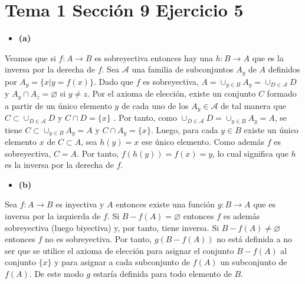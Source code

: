 \documentclass{article}
\begin{document}
\section{Tema 1 Sección 9 Ejercicio 5}
\begin{itemize}
\item \bf (a) \rm
\end{itemize}
Veamos que si $f:A\rightarrow B$ es sobreyectiva entonces hay una  $h:B\rightarrow A$ que es la inversa por la derecha de $f$. Sea $\mathcal{A}$ una familia de subconjuntos $A_y$ de $A$ definidos por $A_y=\{x|y=f(x)\}$. Dado que $f$ es sobreyectiva, $A= \cup_{y \in B}A_y=\cup_{D\in \mathcal{A}}D$ y $A_y\cap A_z=\varnothing$ si $y\neq z$. Por el axioma de elección, existe un conjunto $C$ formado a partir de un único elemento $y$ de cada uno de los $A_y\in \mathcal{A}$ de tal manera que $C\subset \cup_{D\in \mathcal{A}}D$ y $C\cap D=\{x\}$ . Por tanto, como  $\cup_{D\in \mathcal{A}}D=\cup_{y\in B}A_y=A$, se tiene $C\subset \cup_{y\in B}A_y=A$ y $C\cap A_y=\{x\}$. Luego, para cada $y\in B$ existe un único elemento $x$ de $C\subset A$, sea $h(y)=x$ ese único elemento. Como además $f$ es sobreyectiva, $C=A$. Por tanto, $f(h(y))=f(x)=y$, lo cual significa que $h$ es la inversa por la derecha de $f$.
\begin{itemize}
\item \bf (b) \rm
\end{itemize}
Sea $f:A\rightarrow B$ es inyectiva y $A$ entonces existe una función $g:B\rightarrow A$ que es inversa por la izquierda de $f$. Si $B-f(A)= \varnothing$ entonces $f$ es además sobreyectiva (luego biyectiva) y, por tanto, tiene inversa. Si $B-f(A) \neq \varnothing$ entonces $f$ no es sobreyectiva. Por tanto, $g(B-f(A))$ no está definida a no ser que se utilice el axioma de elección para asignar el conjunto $B-f(A)$ al conjunto $\{x\}$ y para asignar a cada subconjunto de $f(A)$ un subconjunto de $f(A)$. De este modo $g$ estaría definida para todo elemento de $B$.
%
%
\end{document}

